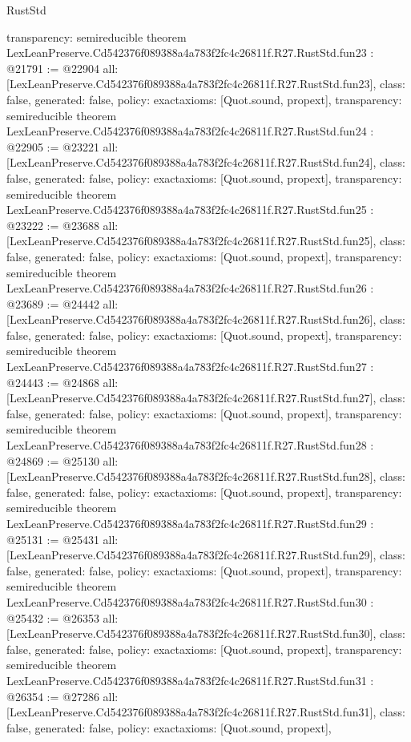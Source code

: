 \begin{lexlean}{RustStd}
\begin{coremodule}
{  transparency: semireducible
}
theorem LexLeanPreserve.Cd542376f089388a4a783f2fc4c26811f.R27.RustStd.fun23 : @21791 := @22904 {
  all: [LexLeanPreserve.Cd542376f089388a4a783f2fc4c26811f.R27.RustStd.fun23],
  class: false,
  generated: false,
  policy: exact{axioms: [Quot.sound, propext]},
  transparency: semireducible
}
theorem LexLeanPreserve.Cd542376f089388a4a783f2fc4c26811f.R27.RustStd.fun24 : @22905 := @23221 {
  all: [LexLeanPreserve.Cd542376f089388a4a783f2fc4c26811f.R27.RustStd.fun24],
  class: false,
  generated: false,
  policy: exact{axioms: [Quot.sound, propext]},
  transparency: semireducible
}
theorem LexLeanPreserve.Cd542376f089388a4a783f2fc4c26811f.R27.RustStd.fun25 : @23222 := @23688 {
  all: [LexLeanPreserve.Cd542376f089388a4a783f2fc4c26811f.R27.RustStd.fun25],
  class: false,
  generated: false,
  policy: exact{axioms: [Quot.sound, propext]},
  transparency: semireducible
}
theorem LexLeanPreserve.Cd542376f089388a4a783f2fc4c26811f.R27.RustStd.fun26 : @23689 := @24442 {
  all: [LexLeanPreserve.Cd542376f089388a4a783f2fc4c26811f.R27.RustStd.fun26],
  class: false,
  generated: false,
  policy: exact{axioms: [Quot.sound, propext]},
  transparency: semireducible
}
theorem LexLeanPreserve.Cd542376f089388a4a783f2fc4c26811f.R27.RustStd.fun27 : @24443 := @24868 {
  all: [LexLeanPreserve.Cd542376f089388a4a783f2fc4c26811f.R27.RustStd.fun27],
  class: false,
  generated: false,
  policy: exact{axioms: [Quot.sound, propext]},
  transparency: semireducible
}
theorem LexLeanPreserve.Cd542376f089388a4a783f2fc4c26811f.R27.RustStd.fun28 : @24869 := @25130 {
  all: [LexLeanPreserve.Cd542376f089388a4a783f2fc4c26811f.R27.RustStd.fun28],
  class: false,
  generated: false,
  policy: exact{axioms: [Quot.sound, propext]},
  transparency: semireducible
}
theorem LexLeanPreserve.Cd542376f089388a4a783f2fc4c26811f.R27.RustStd.fun29 : @25131 := @25431 {
  all: [LexLeanPreserve.Cd542376f089388a4a783f2fc4c26811f.R27.RustStd.fun29],
  class: false,
  generated: false,
  policy: exact{axioms: [Quot.sound, propext]},
  transparency: semireducible
}
theorem LexLeanPreserve.Cd542376f089388a4a783f2fc4c26811f.R27.RustStd.fun30 : @25432 := @26353 {
  all: [LexLeanPreserve.Cd542376f089388a4a783f2fc4c26811f.R27.RustStd.fun30],
  class: false,
  generated: false,
  policy: exact{axioms: [Quot.sound, propext]},
  transparency: semireducible
}
theorem LexLeanPreserve.Cd542376f089388a4a783f2fc4c26811f.R27.RustStd.fun31 : @26354 := @27286 {
  all: [LexLeanPreserve.Cd542376f089388a4a783f2fc4c26811f.R27.RustStd.fun31],
  class: false,
  generated: false,
  policy: exact{axioms: [Quot.sound, propext]},
}
\end{coremodule}
\end{lexlean}
